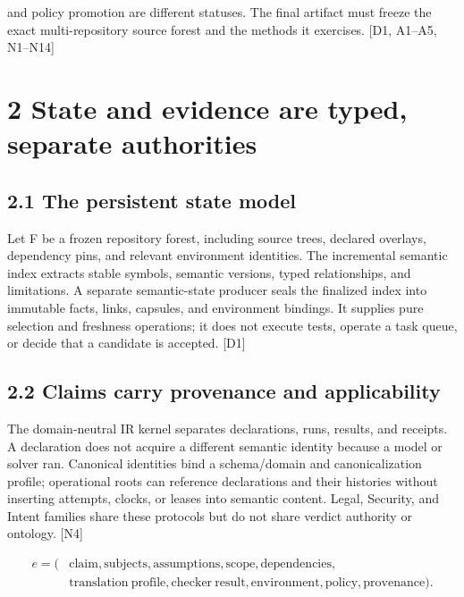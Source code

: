 \documentclass{article}
\begin{document}
and policy promotion are different statuses. The final artifact must freeze the exact multi-repository
source forest and the methods it exercises. [D1, A1–A5, N1–N14]


\section*{2 State and evidence are typed, separate authorities}

\subsection*{2.1 The persistent state model}

Let F be a frozen repository forest, including source trees, declared overlays, dependency pins, and
relevant environment identities. The incremental semantic index extracts stable symbols, semantic
versions, typed relationships, and limitations. A separate semantic-state producer seals the finalized
index into immutable facts, links, capsules, and environment bindings. It supplies pure selection and
freshness operations; it does not execute tests, operate a task queue, or decide that a candidate is
accepted. [D1]

\subsection*{2.2 Claims carry provenance and applicability}

The domain-neutral IR kernel separates declarations, runs, results, and receipts. A declaration does
not acquire a different semantic identity because a model or solver ran. Canonical identities bind a
schema/domain and canonicalization profile; operational roots can reference declarations and their
histories without inserting attempts, clocks, or leases into semantic content. Legal, Security, and
Intent families share these protocols but do not share verdict authority or ontology. [N4]


\setcounter{equation}{0}
\begin{equation}\begin{aligned}
e = (&\mathrm{claim},\mathrm{subjects},\mathrm{assumptions},\mathrm{scope},\mathrm{dependencies},\\
&\mathrm{translation\ profile},\mathrm{checker\ result},\mathrm{environment},\mathrm{policy},\mathrm{provenance}).
\end{aligned}\tag{1}\end{equation}
\end{document}
